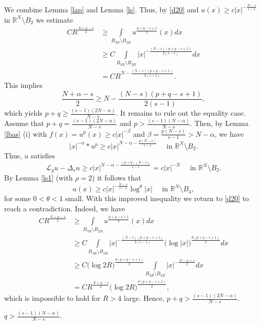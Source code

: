 \documentclass[leqno,12pt]{article}
\numberwithin{equation}{section}
\newcommand{\R}{\mathbb R}
\newcommand{\Lg}{{\mathcal L}_g}
\begin{document}
We combine Lemma \ref{lap} and Lemma \ref{ls}. Thus, by \eqref{d20} and 
$u(x)\geq c|x|^{-\frac{N-s}{s-1}}$ in $\R^N\setminus B_{2}$ we estimate 
$$
\begin{aligned}
CR^{\frac{N+\alpha-s}{2}} &\geq  \int\limits_{B_{3R}\setminus B_{2R}}u^{\frac{p+q-s+1}{2}}(x)dx \\
&\geq C \int\limits_{B_{3R}\setminus B_{2R}}|x|^{-\frac{(N-s)(p+q-s+1)}{2(s-1)}}dx\\
&=CR^{N- \frac{(N-s)(p+q-s+1)}{2(s-1)}}.
\end{aligned}
$$
This implies
$$
\frac{N+\alpha-s}{2}\geq N- \frac{(N-s)(p+q-s+1)}{2(s-1)},
$$
which yields $p+q\geq\frac{(s-1)(2N-\alpha)}{N-s}$. It remains to rule out the equality case. Assume that $p+q=\frac{(s-1)(2N-\alpha)}{N-s}$ and $p> \frac{(s-1)(N-\alpha)}{N-s}$. Then, by Lemma \ref{lbas} (i) with $f(x)=u^p(x)\geq c|x|^{-\beta}$ and $\beta=\frac{p(N-s)}{s-1}>N-\alpha$, we have 
$$
|x|^{-\alpha}*u^p\geq c|x|^{N-\alpha-\frac{p(N-s)}{s-1}}\quad\mbox{ in }\R^N\setminus B_2.
$$
Thus, $u$ satisfies
$$
\Lg u-\Delta_s u\geq c|x|^{N-\alpha-\frac{(p+q)(N-s)}{s-1}}=c|x|^{-N}\quad\mbox{ in }\R^N\setminus B_2.
$$
By Lemma \ref{ls1} (with $\rho=2$) it follows that
\begin{equation}\label{dddd}
u(x)\geq c|x|^{-\frac{N-s}{s-1}}\log^\theta |x|\quad\mbox{ in }\R^N\setminus B_{4},
\end{equation}
for some $0<\theta<1$ small. With this improved inequality we return to \eqref{d20} to reach a contradiction. Indeed, we have
$$
\begin{aligned}
CR^{\frac{N+\alpha-s}{2}} &\geq  \int\limits_{B_{3R}\setminus B_{2R}}u^{\frac{p+q-s+1}{2}}(x)dx \\
&\geq C \int\limits_{B_{3R}\setminus B_{2R}}|x|^{-\frac{(N-s)(p+q-s+1)}{2(s-1)}}\big(\log |x|\big)^{\frac{\theta(p+q-s+1)}{2}} dx\\
&\geq C \big(\log 2R\big)^{\frac{\theta(p+q-s+1)}{2}}\int\limits_{B_{3R}\setminus B_{2R}}|x|^{-\frac{N-\alpha+s}{2}} dx\\
&=CR^{\frac{N+\alpha-s}{2}}(\log 2R\big)^{\frac{\theta(p+q-s+1)}{2}},
\end{aligned}
$$
which is impossible to hold for $R>4$ large. Hence, $p+q>\frac{(s-1)(2N-\alpha)}{N-s}$.




\smallskip

 $q> \frac{(s-1)(N-\alpha)}{N-s}$.
\end{document}
